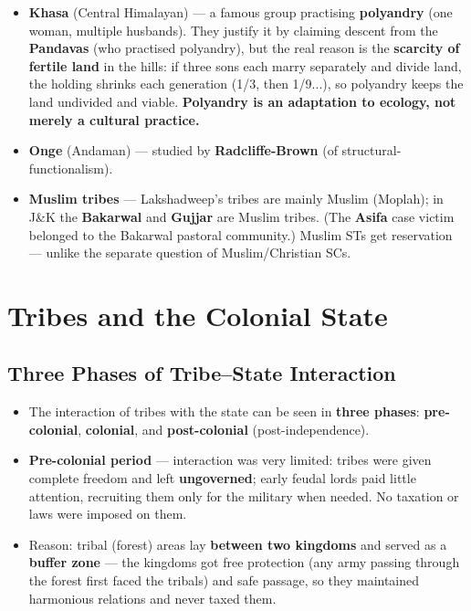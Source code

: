 \begin{ExampleBox}
\begin{itemize}
\item \textbf{Khasa} (Central Himalayan) --- a famous group practising \textbf{polyandry} (one woman, multiple husbands). They justify it by claiming descent from the \textbf{Pandavas} (who practised polyandry), but the real reason is the \textbf{scarcity of fertile land} in the hills: if three sons each marry separately and divide land, the holding shrinks each generation (1/3, then 1/9...), so polyandry keeps the land undivided and viable. \textbf{Polyandry is an adaptation to ecology, not merely a cultural practice.}
\item \textbf{Onge} (Andaman) --- studied by \textbf{Radcliffe-Brown} (of structural-functionalism).
\item \textbf{Muslim tribes} --- Lakshadweep's tribes are mainly Muslim (Moplah); in J\&K the \textbf{Bakarwal} and \textbf{Gujjar} are Muslim tribes. (The \textbf{Asifa} case victim belonged to the Bakarwal pastoral community.) Muslim STs get reservation --- unlike the separate question of Muslim/Christian SCs.
\end{itemize}
\end{ExampleBox}

\section{Tribes and the Colonial State}

\subsection{Three Phases of Tribe--State Interaction}

\begin{KeyConcept}
\begin{itemize}
\item The interaction of tribes with the state can be seen in \textbf{three phases}: \textbf{pre-colonial}, \textbf{colonial}, and \textbf{post-colonial} (post-independence).
\item \textbf{Pre-colonial period} --- interaction was very limited: tribes were given complete freedom and left \textbf{ungoverned}; early feudal lords paid little attention, recruiting them only for the military when needed. No taxation or laws were imposed on them.
\item Reason: tribal (forest) areas lay \textbf{between two kingdoms} and served as a \textbf{buffer zone} --- the kingdoms got free protection (any army passing through the forest first faced the tribals) and safe passage, so they maintained harmonious relations and never taxed them.
\end{itemize}
\end{KeyConcept}

